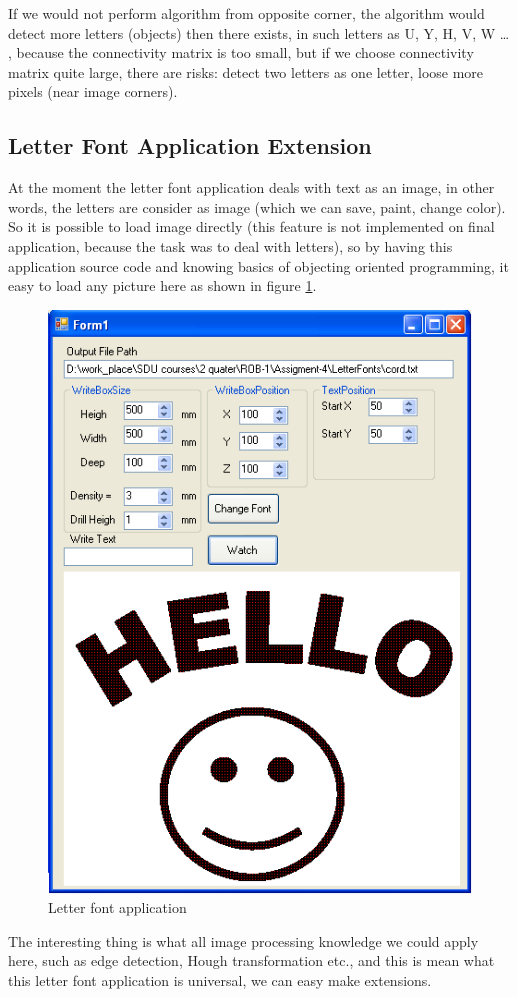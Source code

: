 If we would not perform algorithm from opposite corner, the algorithm would detect more letters (objects) then there exists, in such letters as U, Y, H, V, W … , because the connectivity matrix is too small, but if we choose connectivity matrix quite large, there are risks: detect two letters as one letter, loose more pixels (near image corners).

\subsection{Letter Font Application Extension}
At the moment the letter font application deals with text as an image, in other words, the letters are consider as image (which we can save, paint, change color).  So it is possible to load image directly (this feature is not implemented on final application, because the task was to deal with letters), so by having this application source code and knowing basics of objecting oriented programming, it easy to load any picture here as shown in figure \ref{fig:letterappextension}.   

\begin{figure}[H]
  \centering
  \includegraphics[scale= 0.6]{source/letterappextension.png}
  \caption{Letter font application}
  \label{fig:letterappextension}
\end{figure}

The interesting thing is what all image processing knowledge we could apply here, such as edge detection, Hough transformation etc., and this is mean what this letter font application is universal, we can easy make extensions.  
